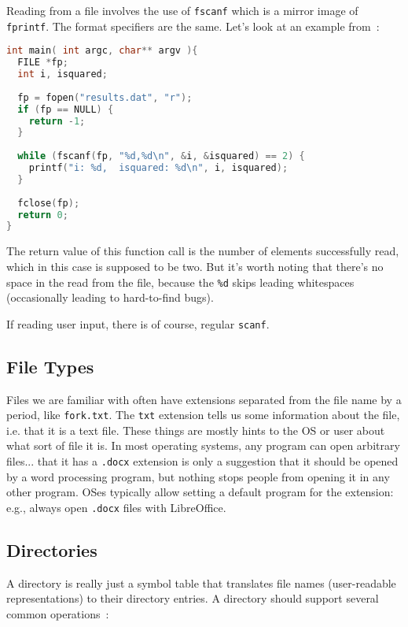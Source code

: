 Reading from a file involves the use of \texttt{fscanf} which is a mirror image of \texttt{fprintf}. The format specifiers are the same. Let's look at an example from~\cite{cfiles}:

\begin{lstlisting}[language=C]
int main( int argc, char** argv ){
  FILE *fp;
  int i, isquared;
   
  fp = fopen("results.dat", "r");
  if (fp == NULL) {
    return -1;
  }
   
  while (fscanf(fp, "%d,%d\n", &i, &isquared) == 2) {
    printf("i: %d,  isquared: %d\n", i, isquared);
  }
  
  fclose(fp);
  return 0;
}
\end{lstlisting}

The return value of this function call is the number of elements successfully read, which in this case is supposed to be two. But it's worth noting that there's no space in the read from the file, because the \texttt{\%d} skips leading whitespaces (occasionally leading to hard-to-find bugs).

If reading user input, there is of course, regular \texttt{scanf}.

\subsection*{File Types}

Files we are familiar with often have extensions separated from the file name by a period, like \texttt{fork.txt}. The \texttt{txt} extension tells us some information about the file, i.e. that it is a text file. These things are mostly hints to the OS or user about what sort of file it is. In most operating systems, any program can open arbitrary files... that it has a \texttt{.docx} extension is only a suggestion that it should be opened by a word processing program, but nothing stops people from opening it in any other program. OSes typically allow setting a default program for the extension: e.g., always open \texttt{.docx} files with LibreOffice.

\subsection*{Directories}

A directory is really just a symbol table that translates file names (user-readable representations) to their directory entries. A directory should support several common operations~\cite{osc}:

